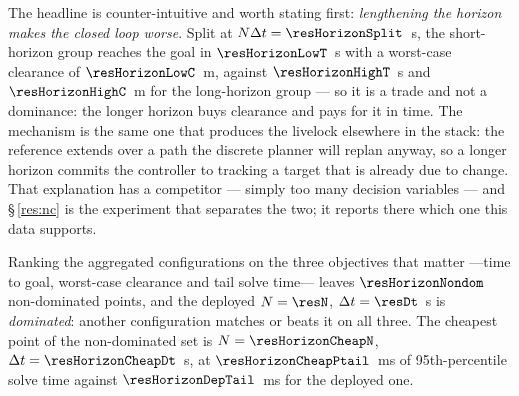 The headline is counter-intuitive and worth stating first: \emph{lengthening the horizon makes the closed loop worse}. Split at $N\Delta t=\resHorizonSplit$~s, the short-horizon group reaches the goal in $\resHorizonLowT$~s with a worst-case clearance of $\resHorizonLowC$~m, against $\resHorizonHighT$~s and $\resHorizonHighC$~m for the long-horizon group --- so it is a trade and not a dominance: the longer horizon buys clearance and pays for it in time. The mechanism is the same one that produces the livelock elsewhere in the stack: the reference extends over a path the discrete planner will replan anyway, so a longer horizon commits the controller to tracking a target that is already due to change. That explanation has a competitor --- simply too many decision variables --- and \S\,\ref{res:nc} is the experiment that separates the two; it reports there which one this data supports.

Ranking the aggregated configurations on the three objectives that matter ---time to goal, worst-case clearance and tail solve time--- leaves $\resHorizonNondom$ non-dominated points, and the deployed $N=\resN$, $\Delta t=\resDt$~s is \emph{dominated}: another configuration matches or beats it on all three. The cheapest point of the non-dominated set is $N=\resHorizonCheapN$, $\Delta t=\resHorizonCheapDt$~s, at $\resHorizonCheapPtail$~ms of 95th-percentile solve time against $\resHorizonDepTail$~ms for the deployed one.


\begin{table}[htbp]
  \centering
  \small
  \caption{Horizon campaign, scenario \texttt{narrow\_gap}. Bold: the deployed configuration $N=15$, $\Delta t=0.35$~s.}
  \label{res:tab:horizon:narrowgap}
\end{table}

\begin{table}[htbp]
  \centering
  \small
  \caption{Horizon campaign, scenario \texttt{u\_trap}. Bold: the deployed configuration $N=15$, $\Delta t=0.35$~s.}
  \label{res:tab:horizon:utrap}
\end{table}

